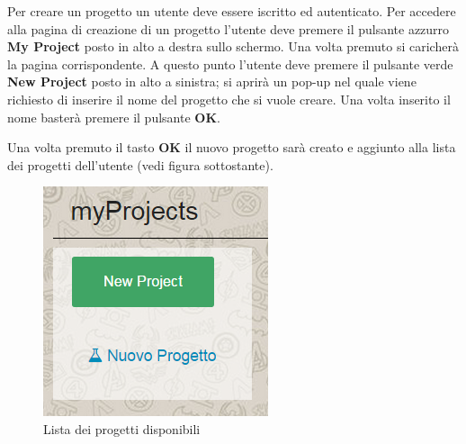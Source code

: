 Per creare un progetto un utente deve essere iscritto ed autenticato. Per accedere alla pagina di creazione di un progetto l'utente deve premere il pulsante azzurro \textbf{My Project} posto in alto a destra sullo schermo. Una volta premuto si caricherà la pagina corrispondente. A questo punto l'utente deve premere il pulsante verde \textbf{New Project} posto in alto a sinistra; si aprirà un pop-up nel quale viene richiesto di inserire il nome del progetto che si vuole creare. Una volta inserito il nome basterà premere il pulsante \textbf{OK}.


\noindent Una volta premuto il tasto \textbf{OK} il nuovo progetto sarà creato e aggiunto alla lista dei progetti dell'utente (vedi figura sottostante).


\begin{figure}[H] 
	\centering 
	\includegraphics[scale=0.60] {img/projectlist.png}
	\caption{Lista dei progetti disponibili} 
\end{figure}